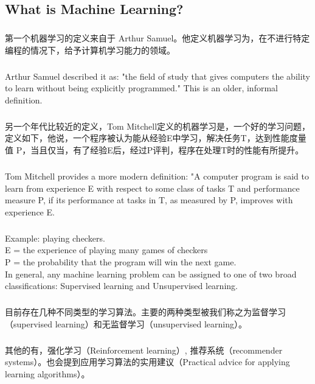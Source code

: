 \documentclass{article}
\begin{document}
\begin{CJK}{UTF8}{gbsn}
\subsection{What is Machine Learning?}
\subparagraph*{}
第一个机器学习的定义来自于 Arthur Samuel。他定义机器学习为，在不进行特定编程的情况下，给予计算机学习能力的领域。
\subparagraph*{}
 Arthur Samuel described it as: "the field of study that gives computers the ability to learn without being explicitly programmed." This is an older, informal definition.
\subparagraph*{}
另一个年代比较近的定义，Tom Mitchell定义的机器学习是，一个好的学习问题，定义如下，他说，一个程序被认为能从经验E中学习，解决任务T，达到性能度量值 P，当且仅当，有了经验E后，经过P评判，程序在处理T时的性能有所提升。
\subparagraph*{}
Tom Mitchell provides a more modern definition: "A computer program is said to learn from experience E with respect to some class of tasks T and performance measure P, if its performance at tasks in T, as measured by P, improves with experience E.
\subparagraph*{}
Example: playing checkers.\\
E = the experience of playing many games of checkers\\
P = the probability that the program will win the next game.\\
In general, any machine learning problem can be assigned to one of two broad classifications:
Supervised learning and Unsupervised learning.\\
\subparagraph*{}
目前存在几种不同类型的学习算法。主要的两种类型被我们称之为监督学习（supervised learning）和无监督学习（unsupervised learning）。
\subparagraph*{}
其他的有，强化学习（Reinforcement learning）, 推荐系统（recommender systems）。也会提到应用学习算法的实用建议（Practical advice for applying learning algorithms）。

\end{CJK}
\end{document}
